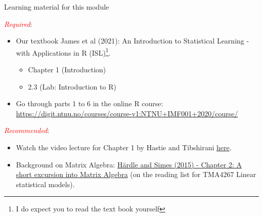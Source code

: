 \documentclass[
  10pt,
  ignorenonframetext,
]{beamer}
\providecommand{\tightlist}{%
  \setlength{\itemsep}{0pt}\setlength{\parskip}{0pt}}
\begin{document}
\begin{frame}
\begin{block}{Learning material for this module}
\protect\hypertarget{learning-material-for-this-module}{}
\(~\)

\emph{\textcolor{red}{Required}}:

\vspace{1mm}

\begin{itemize}
\tightlist
\item
  Our textbook James et al (2021): An Introduction to Statistical
  Learning - with Applications in R
  (ISL)\footnote{I do expect you to read the text book yourself}.

  \begin{itemize}
  \tightlist
  \item
    Chapter 1 (Introduction)
  \item
    2.3 (Lab: Introduction to R)
  \end{itemize}
\end{itemize}

\vspace{2mm}

\begin{itemize}
\tightlist
\item
  Go through parts 1 to 6 in the online R course:
  \url{https://digit.ntnu.no/courses/course-v1:NTNU+IMF001+2020/course/}
\end{itemize}

\vspace{3mm}

\emph{\textcolor{red}{Recommended}}:

\vspace{1mm}

\begin{itemize}
\item
  Watch the video lecture for Chapter 1 by Hastie and Tibshirani
  \href{https://wiki.math.ntnu.no/tma4268/2024v/subpage1}{here}.
\item
  Background on Matrix Algebra:
  \href{https://link.springer.com/chapter/10.1007/978-3-662-45171-7_2}{Härdle
  and Simes (2015) - Chapter 2: A short excursion into Matrix Algebra}
  (on the reading list for TMA4267 Linear statistical models).
\end{itemize}
\end{block}
\end{frame}
\end{document}
